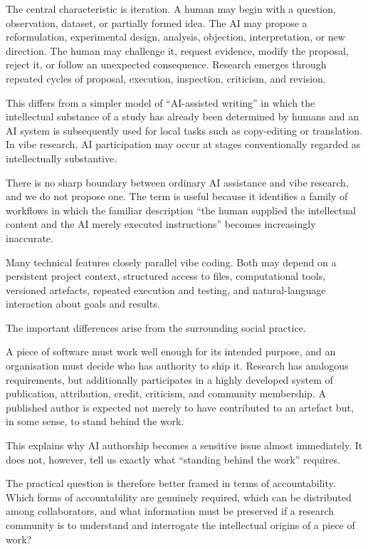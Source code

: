 The central characteristic is iteration. A human may begin with a question, observation, dataset, or partially formed idea. The AI may propose a reformulation, experimental design, analysis, objection, interpretation, or new direction. The human may challenge it, request evidence, modify the proposal, reject it, or follow an unexpected consequence. Research emerges through repeated cycles of proposal, execution, inspection, criticism, and revision.

This differs from a simpler model of ``AI-assisted writing'' in which the intellectual substance of a study has already been determined by humans and an AI system is subsequently used for local tasks such as copy-editing or translation. In vibe research, AI participation may occur at stages conventionally regarded as intellectually substantive.

There is no sharp boundary between ordinary AI assistance and vibe research, and we do not propose one. The term is useful because it identifies a family of workflows in which the familiar description ``the human supplied the intellectual content and the AI merely executed instructions'' becomes increasingly inaccurate.

Many technical features closely parallel vibe coding. Both may depend on a persistent project context, structured access to files, computational tools, versioned artefacts, repeated execution and testing, and natural-language interaction about goals and results.

The important differences arise from the surrounding social practice.

A piece of software must work well enough for its intended purpose, and an organisation must decide who has authority to ship it. Research has analogous requirements, but additionally participates in a highly developed system of publication, attribution, credit, criticism, and community membership. A published author is expected not merely to have contributed to an artefact but, in some sense, to stand behind the work.

This explains why AI authorship becomes a sensitive issue almost immediately. It does not, however, tell us exactly what ``standing behind the work'' requires.

The practical question is therefore better framed in terms of accountability. Which forms of accountability are genuinely required, which can be distributed among collaborators, and what information must be preserved if a research community is to understand and interrogate the intellectual origins of a piece of work?


